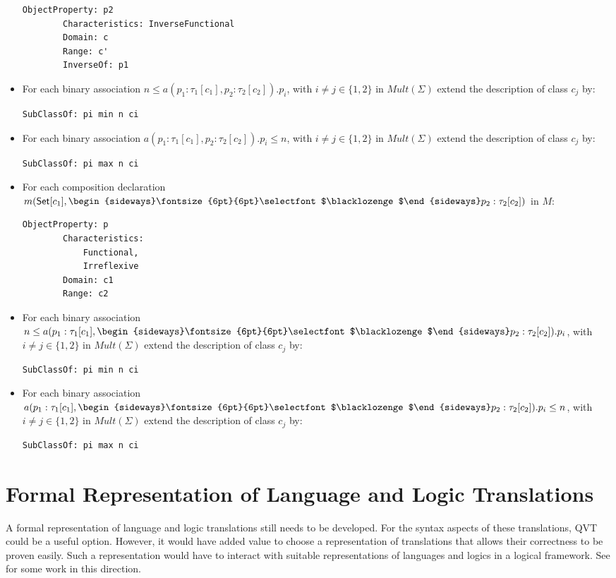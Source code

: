 \documentclass[10pt,fleqn,final]{scrreprt}
\newcommand{\sclause}[1]{\section{#1}}
\newenvironment{definitions}[0]{\medskip }{}
\newcommand{\composition}{\raisebox{0.2pt}{\begin{sideways}\fontsize{6pt}{6pt}\selectfont$\blacklozenge$\end{sideways}}}
\begin{document}
\begin{definitions}
\begin{itemize}
\begin{lstlisting}[language=owl2Manchester]
	ObjectProperty: p2
		Characteristics: InverseFunctional
		Domain: c
		Range: c'
		InverseOf: p1
\end{lstlisting}
\item For each binary association $n \leq a(p_1:\tau_1[c_1],p_2:\tau_2[c_2]).p_i$, with $i \neq j\in\{1,2\}$ in $\mathit{Mult}(\Sigma)$ extend the description of class $c_j$ by:
\begin{lstlisting}[language=owl2Manchester]
	SubClassOf: pi min n ci
\end{lstlisting}
\item For each binary association $a(p_1:\tau_1[c_1],p_2:\tau_2[c_2]).p_i \leq n$, with $i \neq j\in\{1,2\}$  in $\mathit{Mult}(\Sigma)$ extend the description of class $c_j$ by:
\begin{lstlisting}[language=owl2Manchester]
	SubClassOf: pi max n ci
\end{lstlisting}
\item For each composition declaration $m(\mathsf{Set}[c_1], \composition p_2 :
\tau_2[c_2])$ in $M$:
\begin{lstlisting}[language=owl2Manchester]
	ObjectProperty: p
		Characteristics:
			Functional, 
			Irreflexive
		Domain: c1
		Range: c2
\end{lstlisting}
\item For each binary association $n \leq a(p_1:\tau_1[c_1], \composition p_2:\tau_2[c_2]).p_i$, with $i \neq j\in\{1,2\}$  in $\mathit{Mult}(\Sigma)$  extend the description of class $c_j$ by:
\begin{lstlisting}[language=owl2Manchester]
	SubClassOf: pi min n ci
\end{lstlisting}
\item For each binary association $a(p_1:\tau_1[c_1], \composition p_2:\tau_2[c_2]).p_i \leq n$, with $i \neq j\in\{1,2\}$  in $\mathit{Mult}(\Sigma)$ extend the description of class $c_j$ by:
\begin{lstlisting}[language=owl2Manchester]
	SubClassOf: pi max n ci
\end{lstlisting}
\end{itemize}
 

\sclause{Formal Representation of Language and Logic Translations}
\label{sec:repr-trans}

A formal representation of language and logic translations still needs
to be developed. For the syntax aspects of these translations, QVT
could be a useful option. However, it would have added value to choose
a representation of translations that allows  their correctness
to be proven easily. Such a representation would have to interact
with suitable representations of languages and logics in a 
logical framework. See \cite{CodescuEtAl2011d} for some work
in this direction.



\end{definitions}
\end{document}
